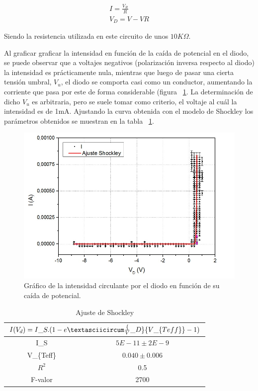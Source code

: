 \documentclass[twoside,twocolumn,a4paper]{article}
\begin{document}
\begin{gather}
I=\frac{V_R}{R} \\
V_D=V-VR
\end{gather}

Siendo la resistencia utilizada en este circuito de unos $10 K\Omega$.
\bigbreak

Al graficar graficar la intensidad en funci\'on de la ca\'ida de potencial en el diodo, se puede observar que a voltajes negativos (polarizaci\'on inversa respecto al diodo) la intensidad es pr\'acticamente nula, mientras que luego de pasar una cierta tensi\'on umbral, $V_u$, el diodo se comporta casi como un conductor, aumentando la corriente que pasa por este de forma considerable (figura ~\ref{fig:diodo_shock}. La determinaci\'on de dicho $V_u$ es arbitraria, pero se suele tomar como criterio, el voltaje al cu\'al la intensidad es de 1mA. Ajustando la curva obtenida con el modelo de Shockley los par\'ametros obtenidos se muestran en la tabla ~\ref{tab:diodo}. 

\begin{figure}[h]
\includegraphics[width=\linewidth]{diodograph.jpg}
\captionsetup{justification=centering}
\caption{Gr\'afico de la intensidad circulante por el diodo en funci\'on de su ca\'ida de potencial.}
\label{fig:diodo_shock}
\end{figure}

\begin{table}[h]
\centering
\captionsetup{justification=centering}
\caption{Ajuste de Shockley}
\label{tab:diodo}
\begin{tabular}{|c|c|}
\hline
\multicolumn{2}{|c|}{$I(V_d)=I\_S . (1-e\textasciicircum \frac\{V\_D\}\{V\_\{Teff\}\}-1)$} \\ \hline
I\_S                                       & $5E-11\pm2E-9$                               \\ \hline
V\_\{Teff\}                                & $0.040\pm0.006$                               \\ \hline
$R^2$                                      & 0.5                                           \\ \hline
F-valor                                    & 2700                                          \\ \hline
\end{tabular}
\end{table}
\end{document}
